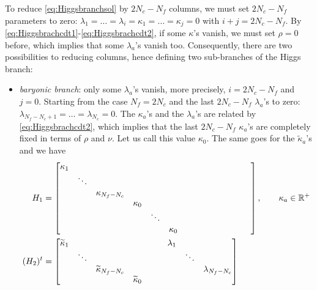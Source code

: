 \begin{itemize}
                To reduce \eqref{eq:Higgsbranchsol} by $2N_c-N_f$ columns, we must set $2N_c-N_f$ parameters to zero: $\lambda_1=\dots=\lambda_i=\kappa_1=\dots=\kappa_j=0$ with $i+j=2N_c-N_f$. By \eqref{eq:Higgsbrachcdt1}-\eqref{eq:Higgsbrachcdt2}, if some $\kappa$'s vanish, we must set $\rho=0$ before, which implies that some $\lambda_a$'s vanish too. Consequently, there are two possibilities to reducing columns, hence defining two sub-branches of the Higgs branch:
                \begin{itemize}[label=$\triangleright$]
                    \item \emph{baryonic branch}: only some $\lambda_a$'s vanish, more precisely, $i=2N_c-N_f$ and $j=0$. Starting from the case $N_f=2N_c$ and  the last $2N_c-N_f$ $\lambda_a$'s to zero: $\lambda_{N_f-N_c+1}=\dots=\lambda_{N_c}=0$. The $\kappa_a$'s and the $\lambda_a$'s are related by \eqref{eq:Higgsbrachcdt2}, which implies that the last $2N_c-N_f$ $\kappa_a$'s are completely fixed in terms of $\rho$ and $\nu$. Let us call this value $\kappa_0$. The same goes for the $\tilde{\kappa}_a$'s and we have
                    \begin{align}
                        \begin{split}
                        H_1 &= 
                        \begin{bmatrix}
                            \kappa_1 & & & & & & \phantom{\lambda_1} & & \\
                            & \ddots & & & & & & \phantom{\ddots} & \\
                            & & \kappa_{N_f-N_c} & & & & & & \phantom{\lambda_{N_f-N_c}} \\
                            & & & \kappa_0 & & & & & \\
                            & & & & \ddots & & & & \\
                            & & & & & \kappa_0 & & &
                        \end{bmatrix},\qquad\kappa_a\in\R^+\\
                        (H_2)^t &= 
                        \begin{bmatrix}
                            \tilde{\kappa}_1 & & & & & & \lambda_1 & & \\
                            & \ddots & & & & & & \ddots & \\
                            & & \tilde{\kappa}_{N_f-N_c} & & & & & & \lambda_{N_f-N_c} \\
                            & & & \tilde{\kappa}_0 & & & & & \\

\end{bmatrix}
\end{split}
\end{align}
\end{itemize}
\end{itemize}
